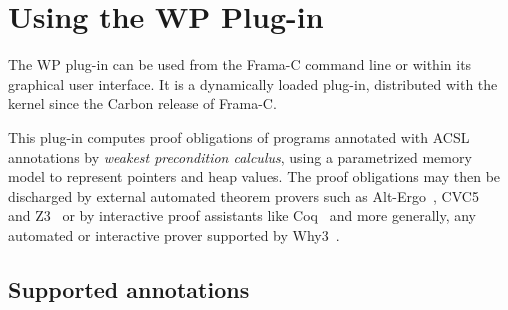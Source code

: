 \chapter{Using the WP Plug-in}
\label{wp-plugin}

The \textsf{WP} plug-in can be used from the \textsf{Frama-C} command line
or within its graphical user interface. It is a
dynamically loaded plug-in, distributed with the kernel since the
\textsf{Carbon} release of \textsf{Frama-C}.

This plug-in computes proof obligations of programs annotated with
\textsf{ACSL} annotations by \emph{weakest precondition calculus},
using a parametrized memory model to represent pointers and heap
values. The proof obligations may then be discharged by external
automated theorem provers such as
\textsf{Alt-Ergo}~\cite{AltErgo2006},
\textsf{CVC5}~\cite{CVC5} and
\textsf{Z3}~\cite{Z3}
or by interactive proof assistants
like \textsf{Coq}~\cite{Coq84} and more generally, any automated or interactive
prover supported by \textsf{Why3}~\cite{Why3}.

\clearpage
\section{Supported annotations}


